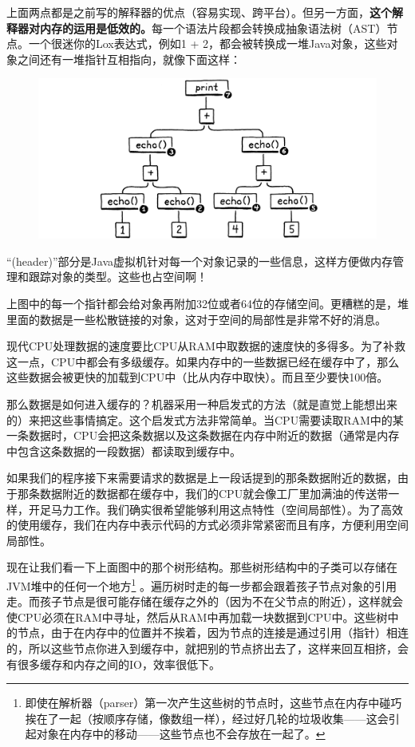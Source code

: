 \documentclass[cn,10pt,math=newtx,citestyle=gb7714-2015,bibstyle=gb7714-2015]{elegantbook}
\begin{document}
上面两点都是之前写的解释器的优点（容易实现、跨平台）。但另一方面，\textbf{这个解释器对内存的运用是低效的。}每一个语法片段都会转换成抽象语法树（AST）节点。一个很迷你的Lox表达式，例如1 + 2，都会被转换成一堆Java对象，这些对象之间还有一堆指针互相指向，就像下面这样：

\begin{figure}[h]
\centering
\includegraphics[width=\textwidth]{image/a-virtual-machine/ast.png}
\end{figure}

\begin{tcolorbox}
“(header)”部分是Java虚拟机针对每一个对象记录的一些信息，这样方便做内存管理和跟踪对象的类型。这些也占空间啊！
\end{tcolorbox}

上图中的每一个指针都会给对象再附加32位或者64位的存储空间。更糟糕的是，堆里面的数据是一些松散链接的对象，这对于空间的局部性是非常不好的消息。

现代CPU处理数据的速度要比CPU从RAM中取数据的速度快的多得多。为了补救这一点，CPU中都会有多级缓存。如果内存中的一些数据已经在缓存中了，那么这些数据会被更快的加载到CPU中（比从内存中取快）。而且至少要快100倍。

那么数据是如何进入缓存的？机器采用一种启发式的方法（就是直觉上能想出来的）来把这些事情搞定。这个启发式方法非常简单。当CPU需要读取RAM中的某一条数据时，CPU会把这条数据以及这条数据在内存中附近的数据（通常是内存中包含这条数据的一段数据）都读取到缓存中。

如果我们的程序接下来需要请求的数据是上一段话提到的那条数据附近的数据，由于那条数据附近的数据都在缓存中，我们的CPU就会像工厂里加满油的传送带一样，开足马力工作。我们确实很希望能够利用这点特性（空间局部性）。为了高效的使用缓存，我们在内存中表示代码的方式必须非常紧密而且有序，方便利用空间局部性。

现在让我们看一下上面图中的那个树形结构。那些树形结构中的子类可以存储在JVM堆中的任何一个地方\footnote{即使在解析器（parser）第一次产生这些树的节点时，这些节点在内存中碰巧挨在了一起（按顺序存储，像数组一样），经过好几轮的垃圾收集——这会引起对象在内存中的移动——这些节点也不会存放在一起了。} 。遍历树时走的每一步都会跟着孩子节点对象的引用走。而孩子节点是很可能存储在缓存之外的（因为不在父节点的附近），这样就会使CPU必须在RAM中寻址，然后从RAM中再加载一块数据到CPU中。这些树中的节点，由于在内存中的位置并不挨着，因为节点的连接是通过引用（指针）相连的，所以这些节点你进入到缓存中，就把别的节点挤出去了，这样来回互相挤，会有很多缓存和内存之间的IO，效率很低下。
\end{document}
